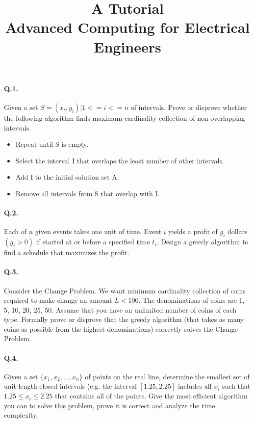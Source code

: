 \documentclass[a4paper,10pt]{article}
\title{A Tutorial\\
Advanced Computing for Electrical Engineers }
\begin{document}
\maketitle

\paragraph{Q.1.}
Given a set $S = {(x_i, y_i)|1 <= i <= n}$ of intervals.
Prove or disprove whether the following algorithm finds
maximum cardinality collection of non-overlapping intervals.
\begin{itemize}
   \item Repeat until S is empty.
  \item Select the interval I that overlaps the least number of other intervals.
  \item Add I to the initial solution set A.
 \item Remove all intervals from S that overlap with I.
\end{itemize}

\paragraph{Q.2.} Each of $n$ given events takes one unit of time. Event $i$
yields a profit of $g_i$ dollars $(g_i > 0)$ if started at or before a specified
time $t_i$. Design a greedy algorithm to find a schedule that maximizes the
profit.

\paragraph{Q.3.} Consider the Change Problem.
We want minimum cardinality collection of coins required to make change an
amount $L < 100$. The denominations of coins are 1, 5, 10, 20, 25, 50. Assume
that you have an unlimited number of coins of each type. Formally prove or
disprove that the greedy algorithm (that takes as many coins as possible from
the highest denominations) correctly solves the Change
Problem.

\paragraph{Q.4.} Given a set $\{ x_1, x_2, ..., x_n \}$ of points on the real
line, determine the smallest
set of unit-length closed intervals (e.g. the interval $[1.25,2.25]$ includes
all $x_i$ such that
$1.25 \leq x_i \leq 2.25$ that contains all of the points.
Give the most efficient algorithm you can to solve this problem, prove it is
correct and analyze the time complexity.
\end{document}
